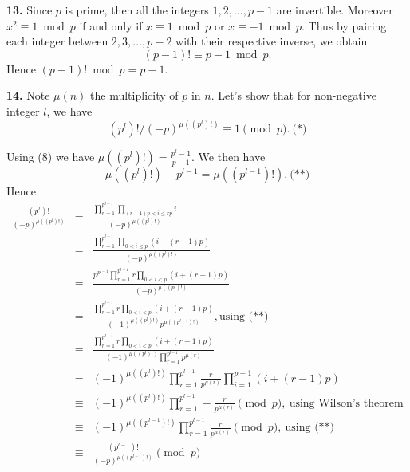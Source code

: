 \documentclass[a4paper,12pt]{article}
\newcommand{\newpar}[1]{\bigskip \noindent \textbf{#1.}}
\begin{document}
\newpar{13} Since $p$ is prime, then all the integers $1, 2, \ldots,
p-1$ are invertible.  Moreover $x^2 \equiv 1 \bmod p$ if and only if
$x\equiv 1 \bmod p$ or $x \equiv -1 \bmod p$.  Thus by pairing each
integer between $2, 3, \ldots, p-2$ with their respective inverse, we
obtain
\[ (p-1)! \equiv p-1 \bmod p.\]
Hence $(p-1)! \bmod p = p-1$.

\newpar{14} Note $\mu(n)$ the multiplicity of $p$ in $n$.  Let's show
that for non-negative integer $l$, we have
\[ (p^l)!/(-p)^{\mu((p^l)!)} \equiv 1 \pmod p.\ \mbox{(*)}\]

Using (8) we have $\mu((p^l)!) = \frac{p^l-1}{p-1}$.  We then have
\[ \mu((p^l)!) - p^{l-1} = \mu((p^{l-1})!).\ \mbox{(**)}\]
Hence
\begin{eqnarray*}
  \frac{(p^l)!}{(-p)^{\mu((p^l)!)}} &=&
  \frac{\prod_{r=1}^{p^{l-1}} \prod_{(r-1)p < i\le rp}
    i}{(-p)^{\mu((p^l)!)}} \\
  &=& \frac{\prod_{r=1}^{p^{l-1}} \prod_{0<i\le p}(i+(r-1)p)}
       {(-p)^{\mu((p^l)!)}} \\
  &=& \frac{p^{p^{l-1}}\prod_{r=1}^{p^{l-1}}r
         \prod_{0<i<p}(i+(r-1)p)}{(-p)^{\mu((p^l)!)}} \\
  &=& \frac{\prod_{r=1}^{p^{l-1}}r
         \prod_{0<i<p}(i+(r-1)p)}{(-1)^{\mu((p^l)!)}
         p^{\mu((p^{l-1})!)}}, \mbox{using (**)} \\
  &=& \frac{\prod_{r=1}^{p^{l-1}} r
         \prod_{0<i<p}(i+(r-1)p)}{(-1)^{\mu((p^l)!)}
         \prod_{r=1}^{p^{l-1}} p^{\mu(r)}} \\
  &=& (-1)^{\mu((p^l)!)}\prod_{r=1}^{p^{l-1}} \frac{r}{p^{\mu(r)}}
       \prod_{i=1}^{p-1}(i+(r-1)p) \\
  &\equiv& (-1)^{\mu((p^l)!)} \prod_{r=1}^{p^{l-1}} -
       \frac{r}{p^{\mu(r)}}\pmod p,\ \mbox{using Wilson's theorem} \\
  &\equiv& (-1)^{\mu((p^{l-1})!)} \prod_{r=1}^{p^{l-1}}
       \frac{r}{p^{\mu(r)}} \pmod p,\ \mbox{using (**)} \\
  &\equiv& \frac{(p^{l-1})!}{(-p)^{\mu((p^{l-1})!)}} \pmod p
\end{eqnarray*}
\end{document}
